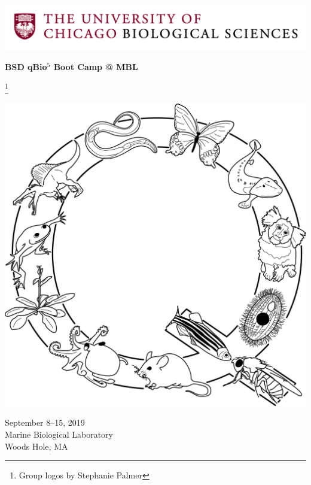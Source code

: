 \documentclass{article}
\newcommand\blfootnote[1]{%
  \begingroup
  \renewcommand\thefootnote{}\footnote{#1}%
  \addtocounter{footnote}{-1}%
  \endgroup
}
\begin{document}
\begin{centering}
\includegraphics[width=\linewidth]{BSDLogo.jpg}

\vspace{0.11in}

\Huge{\textbf{BSD qBio$^5$ Boot Camp @ MBL}}

\blfootnote{Group logos by Stephanie Palmer}

\vspace{0.1in}

\includegraphics[width=0.95\linewidth]{../../logo_group/Q.png}


\vspace{0.2in}

\Large{September 8--15, 2019}\\
\Large{Marine Biological Laboratory}\\
\Large{Woods Hole, MA}

\end{centering}
\end{document}
